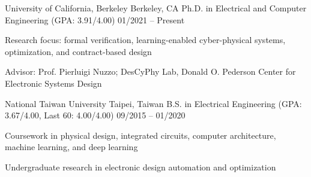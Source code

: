 

\begin{cventries}

  \cventry
    {University of California, Berkeley} %
    {Berkeley, CA} %
    {Ph.D. in Electrical and Computer Engineering (GPA: 3.91/4.00)} %
    {01/2021 -- Present} %
    {
      \vspace{-4.0mm}
      \begin{cvitems} %
        \item {Research focus: formal verification, learning-enabled cyber-physical systems, optimization, and contract-based design}
        \item {Advisor: Prof. Pierluigi Nuzzo; DesCyPhy Lab, Donald O. Pederson Center for Electronic Systems Design}
      \end{cvitems}
    }
  \cventry
    {National Taiwan University} %
    {Taipei, Taiwan} %
    {B.S. in Electrical Engineering (GPA: 3.67/4.00, Last 60: 4.00/4.00)} %
    {09/2015 -- 01/2020} %
    {
      \vspace{-4.0mm}
      \begin{cvitems} %
      \item {Coursework in physical design, integrated circuits, computer architecture, machine learning, and deep learning}
      \item {Undergraduate research in electronic design automation and optimization}
      \end{cvitems}
    }

\end{cventries}
